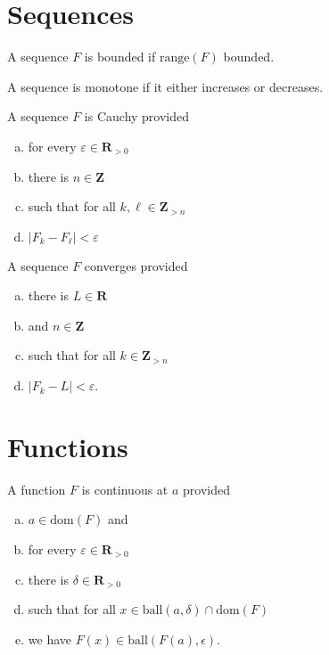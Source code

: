 \documentclass[letterpaper,landscape,9pt,fleqn]{extarticle}
\newcommand{\dom}{\mathrm{dom}}
\newcommand{\range}{\mathrm{range}}
\newcommand{\reals}{\mathbf{R}}
\newcommand{\ball}{\mathrm{ball}}
\newcommand{\integers}{\mathbf{Z}}
\newenvironment{alphalist}{
  \begin{enumerate}[(a)]
    \addtolength{\itemsep}{-1.0\itemsep}}
  {\end{enumerate}}
\begin{document}
\begin{multicols*}{3}
\section*{Sequences}
\begin{description}[\itemsep=0em]
\item[Bounded] A sequence $F$ is bounded if $\range(F)$ bounded.

\item[Monotone] A sequence is monotone if it either increases or
decreases.
\item[Cauchy] A sequence $F$ is Cauchy provided
\vspace{-0.1in}
\begin{alphalist}
    \item for every $\varepsilon \in \reals_{>0}$
    \item there is $n \in \integers$
    \item such that for all $k,\ell \in \integers_{>n}$
    \item $|F_k - F_\ell| < \varepsilon$
\end{alphalist}

\item[Converges] A sequence $F$ converges provided
\vspace{-0.1in}
\begin{alphalist}
    \item there is $L \in \reals$
    \item and $n \in \integers$
    \item such that for all $k \in \integers_{>n}$
    \item $|F_k - L | < \varepsilon$.
\end{alphalist}
\end{description}

\section*{Functions}   
\begin{description}[\itemsep=0em]
    \item[Continuous] A function $F$ is continuous at $a$ provided
    \begin{alphalist}
        \item $a \in \dom(F)$ and
        \item for every $\varepsilon \in \reals_{>0}$
        \item there is $\delta \in \reals_{>0}$
        \item such that for all $x \in \ball(a,\delta) \cap \dom(F)$
        \item we have $F(x) \in \ball(F(a), \epsilon)$.
    \end{alphalist}


\end{description}
\end{multicols*}
\end{document}
